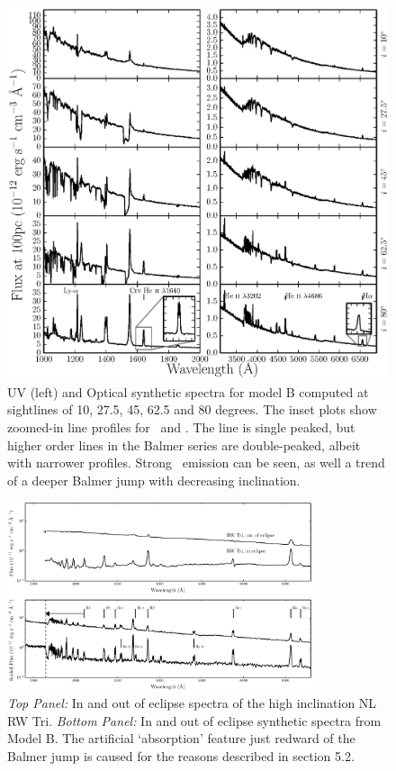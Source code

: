 \documentclass[preprint, a4paper, 11pt]{aastex}
\begin{document}
{\begin{figure} %
\includegraphics[width=\textwidth]{figures/fig14_uv_opt.eps}
\caption{
UV (left) and Optical synthetic spectra for model B computed at
sightlines of 10, 27.5, 45, 62.5 and 80 degrees.	
The inset plots show zoomed-in line profiles for 
\heiiuv\ and \ha. The \ha line 
is single peaked, but higher order lines in the Balmer series
are double-peaked, albeit with narrower profiles.
Strong \heiiopt\ emission can be seen, as well a trend
of a deeper Balmer jump with decreasing inclination.
}
\label{uvoptb}
\end{figure} %


\begin{figure} %
\includegraphics[width=0.8\textwidth]{figures/fig13_eclipse.eps}
\caption{{\sl Top Panel:} In and out of eclipse spectra of the high
inclination NL RW Tri. {\sl Bottom Panel:} In and out of eclipse synthetic
spectra from Model B.
The artificial `absorption' feature just redward of the Balmer jump
is caused for the reasons described in section 5.2.}
\label{rwtricomp}
\end{figure} %


}
\end{document}
